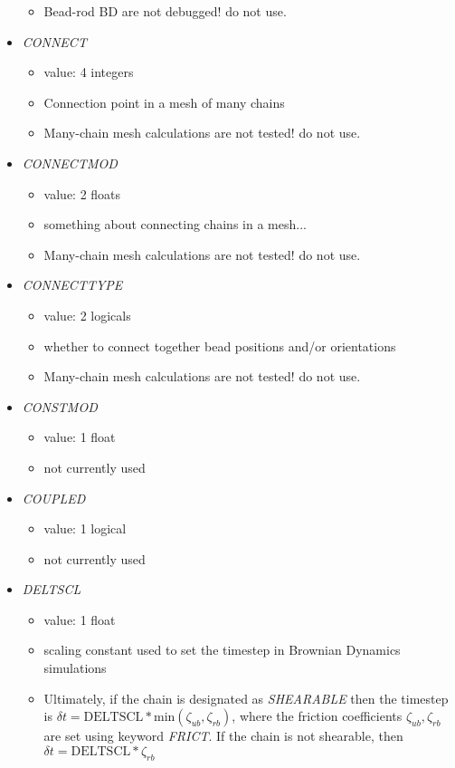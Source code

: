 \documentclass[12pt]{article}
\begin{document}
\begin{itemize}
\begin{itemize}
    \item {\color{red} Bead-rod BD are not debugged! do not use.}
  \end{itemize}
%
\item {\it CONNECT}
  \begin{itemize}
    \item  value: 4 integers
    \item Connection point in a mesh of many chains
    \item {\color{red} Many-chain mesh calculations are not tested! do not use.}
  \end{itemize}
%
\item {\it CONNECTMOD}
  \begin{itemize}
    \item  value: 2 floats
    \item something about connecting chains in a mesh...
    \item {\color{red} Many-chain mesh calculations are not tested! do not use.}
  \end{itemize}
%
\item {\it CONNECTTYPE}
  \begin{itemize}
    \item  value: 2 logicals
    \item whether to connect together bead positions and/or orientations
    \item {\color{red} Many-chain mesh calculations are not tested! do not use.}
  \end{itemize}
%
\item {\it CONSTMOD}
  \begin{itemize}
    \item  value: 1 float
    \item not currently used
  \end{itemize}
%
\item {\it COUPLED}
  \begin{itemize}
    \item  value: 1 logical
    \item not currently used
  \end{itemize}
%
\item {\it DELTSCL}
  \begin{itemize}
    \item  value: 1 float
    \item scaling constant used to set the timestep in Brownian Dynamics simulations
    \item Ultimately, if the chain is designated as {\it SHEARABLE} then the timestep is $\delta t = \text{DELTSCL} * \text{min}(\zeta_{ub},\zeta_{rb})$, where the friction coefficients $\zeta_{ub},\zeta_{rb}$ are set using keyword {\it FRICT}. If the chain is not shearable, then $\delta t = \text{DELTSCL} * \zeta_{rb}$

\end{itemize}
\end{itemize}
\end{document}
